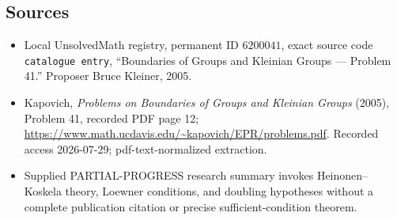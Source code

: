 \documentclass[11pt]{article}
\begin{document}
\subsection{Sources}
\begin{itemize}
\item Local UnsolvedMath registry, permanent ID \(6200041\), exact source code \texttt{catalogue entry}, ``Boundaries of Groups and Kleinian Groups --- Problem 41.'' Proposer Bruce Kleiner, 2005.
\item Kapovich, \emph{Problems on Boundaries of Groups and Kleinian Groups} (2005), Problem 41, recorded PDF page 12; \url{https://www.math.ucdavis.edu/~kapovich/EPR/problems.pdf}. Recorded access 2026-07-29; pdf-text-normalized extraction.
\item Supplied PARTIAL-PROGRESS research summary invokes Heinonen--Koskela theory, Loewner conditions, and doubling hypotheses without a complete publication citation or precise sufficient-condition theorem.
\end{itemize}
\end{document}
